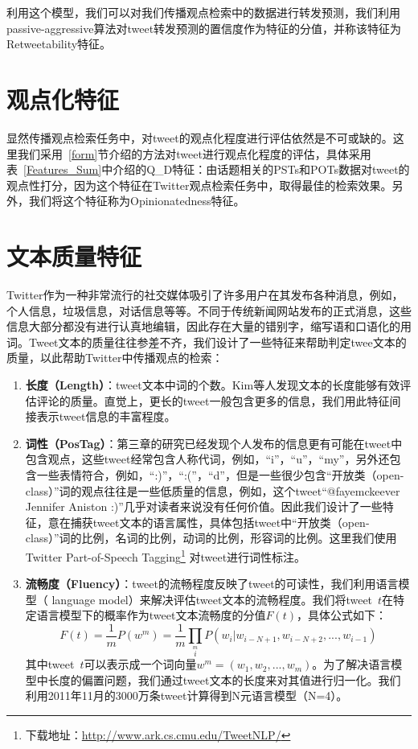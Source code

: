 利用这个模型，我们可以对我们传播观点检索中的数据进行转发预测，我们利用passive-aggressive算法对tweet转发预测的置信度作为特征的分值，并称该特征为Retweetability特征。

\section{观点化特征}
显然传播观点检索任务中，对tweet的观点化程度进行评估依然是不可或缺的。这里我们采用~\ref{form}节介绍的方法对tweet进行观点化程度的评估，具体采用表~\ref{Features_Sum}中介绍的Q\_D特征：由话题相关的PSTs和POTs数据对tweet的观点性打分，因为这个特征在Twitter观点检索任务中，取得最佳的检索效果。另外，我们将这个特征称为Opinionatedness特征。

\section{文本质量特征}
Twitter作为一种非常流行的社交媒体吸引了许多用户在其发布各种消息，例如，个人信息，垃圾信息，对话信息等等。不同于传统新闻网站发布的正式消息，这些信息大部分都没有进行认真地编辑，因此存在大量的错别字，缩写语和口语化的用词。Tweet文本的质量往往参差不齐，我们设计了一些特征来帮助判定twee文本的质量，以此帮助Twitter中传播观点的检索：

 \begin{enumerate}
\item{\textbf{长度（Length）}}：tweet文本中词的个数。Kim等人发现文本的长度能够有效评估评论的质量。直觉上，更长的tweet一般包含更多的信息，我们用此特征间接表示tweet信息的丰富程度。
\item{\textbf{词性（PosTag）}}：第三章的研究已经发现个人发布的信息更有可能在tweet中包含观点，这些tweet经常包含人称代词，例如，“i”，“u”，“my”，另外还包含一些表情符合，例如，“:)”，“:(”，“d”，但是一些很少包含“开放类（open-class）”词的观点往往是一些低质量的信息，例如，这个tweet“@fayemckeever Jennifer Aniston :)”几乎对读者来说没有任何价值。因此我们设计了一些特征，意在捕获tweet文本的语言属性，具体包括tweet中“开放类（open-class）”词的比例，名词的比例，动词的比例，形容词的比例。这里我们使用Twitter Part-of-Speech Tagging\footnote{下载地址：\url{http://www.ark.cs.cmu.edu/TweetNLP/}} 对tweet进行词性标注。
\item{\textbf{流畅度（Fluency）}}：tweet的流畅程度反映了tweet的可读性，我们利用语言模型（ language model）来解决评估tweet文本的流畅程度。我们将tweet~$t$在特定语言模型下的概率作为tweet文本流畅度的分值$F(t)$，具体公式如下：
$$F(t)=\frac{1}{m}P(w^m) =\frac{1}{m}\prod\limits_i\limits^m P(w_i | w_{i-N+1}, w_{i-N+2},...,w_{i-1})$$ 
其中tweet~$t$可以表示成一个词向量$w^m=(w_1,w_2,...,w_m)$。为了解决语言模型中长度的偏置问题，我们通过tweet文本的长度来对其值进行归一化。我们利用2011年11月的3000万条tweet计算得到N元语言模型（N=4）。
\end{enumerate}

